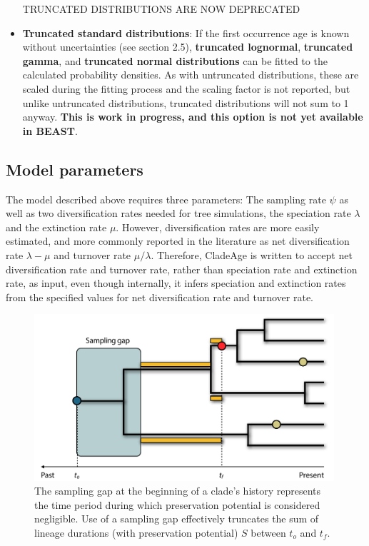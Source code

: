 \documentclass{article}
\begin{document}
\begin{itemize}
 TRUNCATED DISTRIBUTIONS ARE NOW DEPRECATED
\item
{\bf Truncated standard distributions}: If the first occurrence age is known without uncertainties (see section 2.5), {\bf truncated lognormal}, {\bf truncated gamma}, and {\bf truncated normal distributions} can be fitted to the calculated probability densities. As with untruncated distributions, these are scaled during the fitting process and the scaling factor is not reported, but unlike untruncated distributions, truncated distributions will not sum to 1 anyway. {\bf This is work in progress, and this option is not yet available in BEAST}.
\fi
\end{itemize}

\subsection{Model parameters}
The model described above requires three parameters: The sampling rate $\psi$ as well as two diversification rates needed for tree simulations, the speciation rate $\lambda$ and the extinction rate $\mu$. However, diversification rates are more easily estimated, and more commonly reported in the literature as net diversification rate $\lambda - \mu$ and turnover rate $\mu / \lambda$. Therefore, CladeAge is written to accept net diversification rate and turnover rate, rather than speciation rate and extinction rate, as input, even though internally, it infers speciation and extinction rates from the specified values for net diversification rate and turnover rate.

\begin{figure}[b!]
\centering
\includegraphics[width=0.99\textwidth]{samplingGap}
\caption{The sampling gap at the beginning of a clade's history represents the time period during which preservation potential is considered negligible. Use of a sampling gap effectively truncates the sum of lineage durations (with preservation potential) $S$ between $t_o$ and $t_f$.}
\end{figure}
\end{document}
